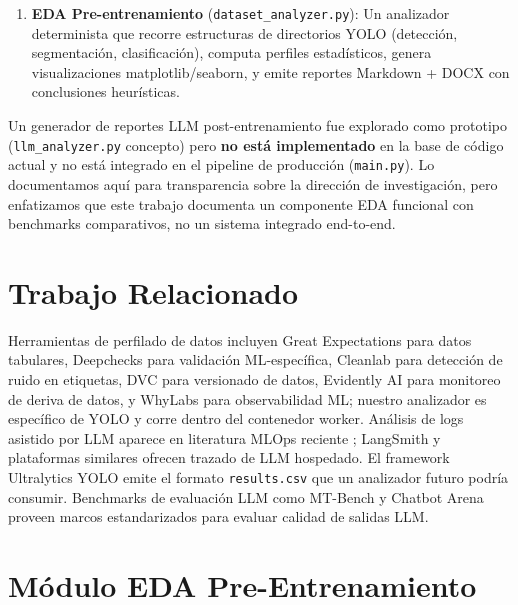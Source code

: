 \documentclass[10pt,twocolumn,letterpaper]{article}
\begin{document}
\begin{enumerate}
    \item \textbf{EDA Pre-entrenamiento} (\texttt{dataset\_analyzer.py}): Un analizador determinista que recorre estructuras de directorios YOLO (detección, segmentación, clasificación), computa perfiles estadísticos, genera visualizaciones matplotlib/seaborn, y emite reportes Markdown + DOCX con conclusiones heurísticas.
\end{enumerate}

Un generador de reportes LLM post-entrenamiento fue explorado como prototipo (\texttt{llm\_analyzer.py} concepto) pero \textbf{no está implementado} en la base de código actual y no está integrado en el pipeline de producción (\texttt{main.py}). Lo documentamos aquí para transparencia sobre la dirección de investigación, pero enfatizamos que este trabajo documenta un componente EDA funcional con benchmarks comparativos, no un sistema integrado end-to-end.

\section{Trabajo Relacionado}
Herramientas de perfilado de datos incluyen Great Expectations \cite{greatexpectations2023} para datos tabulares, Deepchecks \cite{deepchecks2023} para validación ML-específica, Cleanlab \cite{northcutt2021cleanlab} para detección de ruido en etiquetas, DVC \cite{kuprie2022dvc} para versionado de datos, Evidently AI \cite{evidently2023} para monitoreo de deriva de datos, y WhyLabs \cite{whylabs2023} para observabilidad ML; nuestro analizador es específico de YOLO y corre dentro del contenedor worker. Análisis de logs asistido por LLM aparece en literatura MLOps reciente \cite{symeonidis2022mlops}; LangSmith \cite{langsmith2023} y plataformas similares ofrecen trazado de LLM hospedado. El framework Ultralytics YOLO \cite{jocher2023ultralytics} emite el formato \texttt{results.csv} que un analizador futuro podría consumir. Benchmarks de evaluación LLM como MT-Bench \cite{zheng2023judging} y Chatbot Arena \cite{chiang2024chatbot} proveen marcos estandarizados para evaluar calidad de salidas LLM.

\section{Módulo EDA Pre-Entrenamiento}
\end{document}
